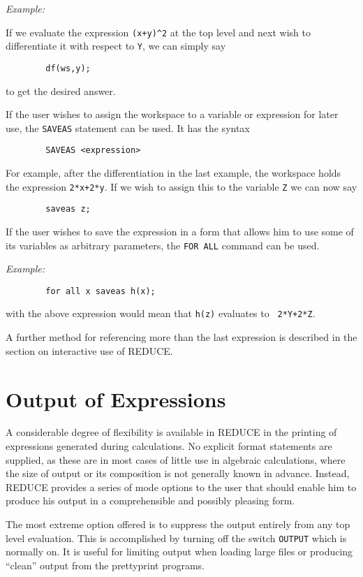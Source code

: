 \documentclass[11pt,letterpaper]{book}
\makeatletter
\newcommand{\REDUCE}{REDUCE}
\newcommand{\underscore}{\_}
\newcommand{\ttindex}[1]{{\renewcommand{\_}{\protect\underscore}%
                          \index{#1@{\tt #1}}}}
\makeatother
\begin{document}
{\it Example:}

If we evaluate the expression {\tt (x+y)\verb|^|2} at the top level and next
wish to differentiate it with respect to {\tt Y}, we can simply say
{\small\begin{verbatim}
        df(ws,y);
\end{verbatim}}
to get the desired answer.

If the user wishes to assign the workspace to a variable or expression for
later use, the {\tt SAVEAS}\ttindex{SAVEAS} statement can be used.  It
has the syntax
{\small\begin{verbatim}
        SAVEAS <expression>
\end{verbatim}}
For example, after the differentiation in the last example, the workspace
holds the expression {\tt 2*x+2*y}.  If we wish to assign this to the
variable {\tt Z} we can now say
{\small\begin{verbatim}
        saveas z;
\end{verbatim}}
If the user wishes to save the expression in a form that allows him to use
some of its variables as arbitrary parameters, the {\tt FOR ALL}
command can be used.

{\it Example:}
{\small\begin{verbatim}
        for all x saveas h(x);
\end{verbatim}}

with the above expression would mean that {\tt h(z)} evaluates to {\tt
2*Y+2*Z}.

A further method for referencing more than the last expression is described
in the section on interactive use of {\REDUCE}.


\section{Output of Expressions}

A considerable degree of flexibility is available in {\REDUCE} in the
printing of expressions generated during calculations.  No explicit format
statements are supplied, as these are in most cases of little use in
algebraic calculations, where the size of output or its composition is not
generally known in advance.  Instead, {\REDUCE} provides a series of mode
options to the user that should enable him to produce his output in a
comprehensible and possibly pleasing form.

The most extreme option offered is to suppress the output entirely from
any top level evaluation.  This is accomplished by turning off the switch
{\tt OUTPUT}\ttindex{OUTPUT} which is normally on.  It is useful for
limiting output when loading large files or producing ``clean'' output from
the prettyprint programs.
\end{document}

